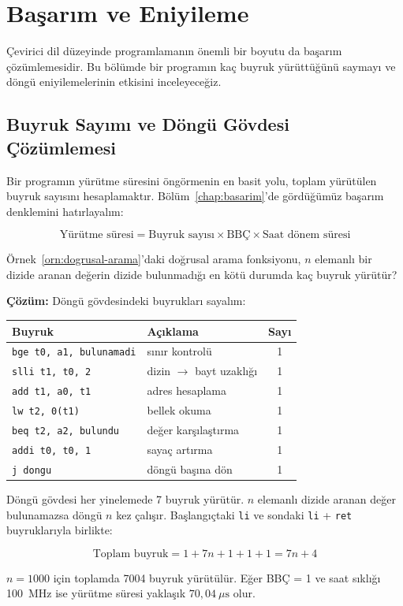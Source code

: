 \section{Başarım ve Eniyileme}
\label{sec:basarim-eniyileme}

Çevirici dil düzeyinde programlamanın önemli bir boyutu da başarım çözümlemesidir. Bu bölümde bir programın kaç buyruk yürüttüğünü saymayı ve döngü eniyilemelerinin etkisini inceleyeceğiz.

\subsection{Buyruk Sayımı ve Döngü Gövdesi Çözümlemesi}
\label{subsec:buyruk-sayimi}

Bir programın yürütme süresini öngörmenin en basit yolu, toplam yürütülen buyruk sayısını hesaplamaktır. Bölüm~\ref{chap:basarim}'de gördüğümüz başarım denklemini hatırlayalım:

\[
\text{Yürütme süresi} = \text{Buyruk sayısı} \times \text{BBÇ} \times \text{Saat dönem süresi}
\]

\begin{ornek}[4.20]
\label{orn:buyruk-sayimi}
Örnek~\ref{orn:dogrusal-arama}'daki doğrusal arama fonksiyonu, $n$ elemanlı bir dizide aranan değerin dizide bulunmadığı en kötü durumda kaç buyruk yürütür?

\textbf{Çözüm:} Döngü gövdesindeki buyrukları sayalım:

\begin{center}
\small
\begin{tabular}{l l c}
\toprule
\textbf{Buyruk} & \textbf{Açıklama} & \textbf{Sayı} \\
\midrule
\texttt{bge t0, a1, bulunamadi} & sınır kontrolü & 1 \\
\texttt{slli t1, t0, 2} & dizin $\rightarrow$ bayt uzaklığı & 1 \\
\texttt{add t1, a0, t1} & adres hesaplama & 1 \\
\texttt{lw t2, 0(t1)} & bellek okuma & 1 \\
\texttt{beq t2, a2, bulundu} & değer karşılaştırma & 1 \\
\texttt{addi t0, t0, 1} & sayaç artırma & 1 \\
\texttt{j dongu} & döngü başına dön & 1 \\
\bottomrule
\end{tabular}
\end{center}

Döngü gövdesi her yinelemede 7 buyruk yürütür. $n$ elemanlı dizide aranan değer bulunamazsa döngü $n$ kez çalışır. Başlangıçtaki \texttt{li} ve sondaki \texttt{li} + \texttt{ret} buyruklarıyla birlikte:

\[
\text{Toplam buyruk} = 1 + 7n + 1 + 1 + 1 = 7n + 4
\]

$n = 1000$ için toplamda 7004 buyruk yürütülür. Eğer BBÇ = 1 ve saat sıklığı 100~MHz ise yürütme süresi yaklaşık $70{,}04~\mu\text{s}$ olur.
\end{ornek}

